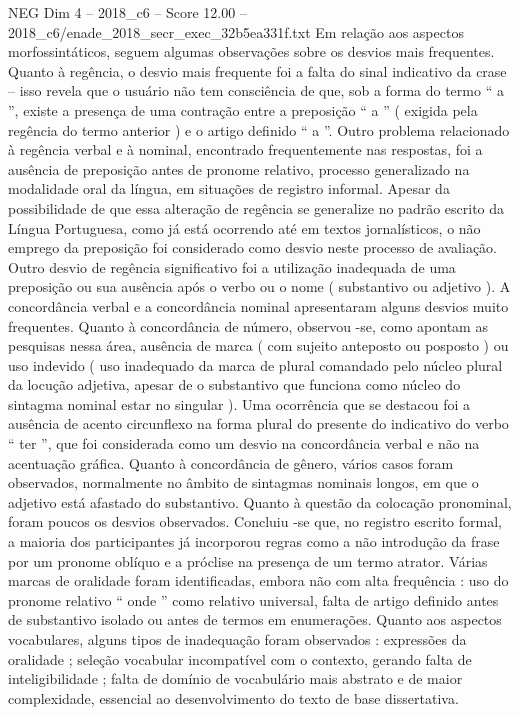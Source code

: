 \begin{textsample}{NEG Dim 4 – 2018\_c6 – Score 12.00 – 2018\_c6/enade\_2018\_secr\_exec\_32b5ea331f.txt}
Em relação aos aspectos morfossintáticos, seguem algumas observações sobre os desvios mais frequentes.
Quanto à regência, o desvio mais frequente foi a falta do sinal indicativo da crase – isso revela que o usuário não tem consciência de que, sob a forma do termo “ a ”, existe a presença de uma contração entre a preposição “ a ” ( exigida pela regência do termo anterior ) e o artigo definido “ a ”.
Outro problema relacionado à regência verbal e à nominal, encontrado frequentemente nas respostas, foi a ausência de preposição antes de pronome relativo, processo generalizado na modalidade oral da língua, em situações de registro informal.
Apesar da possibilidade de que essa alteração de regência se generalize no padrão escrito da Língua Portuguesa, como já está ocorrendo até em textos jornalísticos, o não emprego da preposição foi considerado como desvio neste processo de avaliação.
Outro desvio de regência significativo foi a utilização inadequada de uma preposição ou sua ausência após o verbo ou o nome ( substantivo ou adjetivo ).
A concordância verbal e a concordância nominal apresentaram alguns desvios muito frequentes.
Quanto à concordância de número, observou -se, como apontam as pesquisas nessa área, ausência de marca ( com sujeito anteposto ou posposto ) ou uso indevido ( uso inadequado da marca de plural comandado pelo núcleo plural da locução adjetiva, apesar de o substantivo que funciona como núcleo do sintagma nominal estar no singular ).
Uma ocorrência que se destacou foi a ausência de acento circunflexo na forma plural do presente do indicativo do verbo “ ter ”, que foi considerada como um desvio na concordância verbal e não na acentuação gráfica.
Quanto à concordância de gênero, vários casos foram observados, normalmente no âmbito de sintagmas nominais longos, em que o adjetivo está afastado do substantivo.
Quanto à questão da colocação pronominal, foram poucos os desvios observados.
Concluiu -se que, no registro escrito formal, a maioria dos participantes já incorporou regras como a não introdução da frase por um pronome oblíquo e a próclise na presença de um termo atrator.
Várias marcas de oralidade foram identificadas, embora não com alta frequência : uso do pronome relativo “ onde ” como relativo universal, falta de artigo definido antes de substantivo isolado ou antes de termos em enumerações.
Quanto aos aspectos vocabulares, alguns tipos de inadequação foram observados : expressões da oralidade ; seleção vocabular incompatível com o contexto, gerando falta de inteligibilidade ; falta de domínio de vocabulário mais abstrato e de maior complexidade, essencial ao desenvolvimento do texto de base dissertativa.

\end{textsample}
